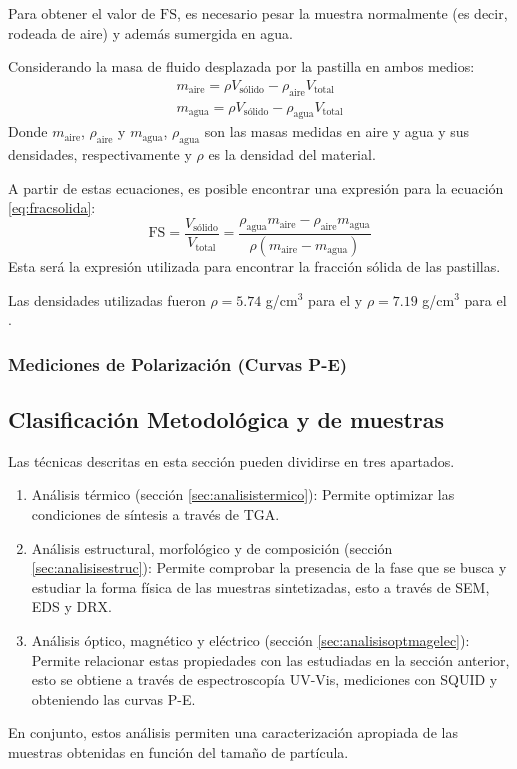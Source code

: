 \documentclass[../main.tex]{subfiles}
\begin{document}
Para obtener el valor de $\text{FS}$, es necesario pesar la muestra normalmente (es decir, rodeada de aire) y además sumergida en agua.

Considerando la masa de fluido desplazada por la pastilla en ambos medios:
\begin{equation}
    \begin{split}
        m_\text{aire}=\rho V_\text{sólido} - \rho_\text{aire} V_\text{total}\\
        m_\text{agua}=\rho V_\text{sólido} - \rho_\text{agua} V_\text{total}
    \end{split}
    \label{eq:masasaireagua}
\end{equation}
Donde $m_\text{aire}$, $\rho_\text{aire}$  y $m_\text{agua}$, $\rho_\text{agua}$ son las masas medidas en aire y agua y sus densidades, respectivamente y $\rho$ es la densidad del material.

A partir de estas ecuaciones, es posible encontrar una expresión para la ecuación \ref{eq:fracsolida}:
\begin{equation}
    \text{FS}=\dfrac{V_\text{sólido}}{V_\text{total}}=\dfrac{\rho_\text{agua}m_\text{aire}-\rho_\text{aire}m_\text{agua}}{\rho(m_\text{aire}-m_\text{agua})}
    \label{eq:fracsolidamasas}
\end{equation}
Esta será la expresión utilizada para encontrar la fracción sólida de las pastillas.

Las densidades utilizadas fueron $\rho=5.74$ g/cm$^3$ para el \neod{} \cite{densneod} y $\rho=7.19$ g/cm$^3$ para el \sama{} \cite{denssama}.

\subsubsection{Mediciones de Polarización (Curvas P-E)}

\subsection{Clasificación Metodológica y de muestras}
Las técnicas descritas en esta sección pueden dividirse en tres apartados.
\begin{enumerate}
    \item Análisis térmico (sección \ref{sec:analisistermico}): Permite optimizar las condiciones de síntesis a través de TGA.
    \item Análisis estructural, morfológico y de composición (sección \ref{sec:analisisestruc}): Permite comprobar la presencia de la fase que se busca y estudiar la forma física de las muestras sintetizadas, esto a través de SEM, EDS y DRX.
    \item Análisis óptico, magnético y eléctrico (sección \ref{sec:analisisoptmagelec}): Permite relacionar estas propiedades con las estudiadas en la sección anterior, esto se obtiene a través de espectroscopía UV-Vis, mediciones con SQUID y obteniendo las curvas P-E.
\end{enumerate} 
En conjunto, estos análisis permiten una caracterización apropiada de las muestras obtenidas en función del tamaño de partícula.
\end{document}
